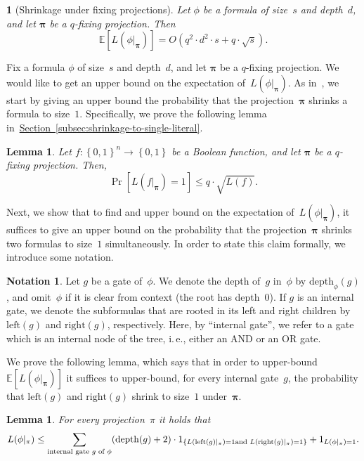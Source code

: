 \documentclass[11pt]{article}
\makeatletter
\numberwithin{equation}{section}
\newtheorem{lemma}[theorem]{Lemma}
\theoremstyle{definition}
\theoremstyle{plain}
\newcommand{\ie}{i.\,e.}
\newcommand{\expref}[2]{\hyperref[#2]{#1~\ref{#2}}}
\theoremstyle{definition}\newtheorem{notation}[theorem]{Notation}\theoremstyle{plain}
\newcommand{\E}{\mathbb{E}}
\newcommand{\B}{\left\{ 0,1 \right \}}
\newcommand{\p}{\boldsymbol{\pi}}
\newcommand{\dpt}{\mathrm{depth}}
\newcommand{\lc}{\mathrm{left}}
\newcommand{\rc}{\mathrm{right}}
\theoremstyle{definition}
\theoremstyle{plain}
\newtheorem*{restated@theorem}{\rep@title}
\newenvironment{restated}[1]{%
	 \def\rep@title{#1}%
	 \begin{restated@theorem}}%
	{\end{restated@theorem}}
\makeatother
\begin{document}
\begin{restated}{\expref{Theorem}{thm:shrinkage-fixing}}[Shrinkage under fixing projections]
Let $\phi$ be a formula of size~$s$ and depth~$d$, and let
$\p$ be a $q$-fixing projection. Then 
\[
\E\left[L(\phi|_{\p})\right]=O\!\left(q^{2}\cdot d^{2}\cdot s+q\cdot\sqrt{s}\right).
\]
\end{restated}

Fix a formula $\phi$ of size~$s$ and depth~$d$, and let $\p$
be a $q$-fixing projection. We would like to
%
get an upper bound on  %
the expectation
of~$L(\phi|_{\p})$. As in~\cite{H98}, we start by 
%
giving an upper bound %
the probability that the projection~$\p$ shrinks a formula to size~$1$.
Specifically, we prove the following lemma in~\expref{Section}{subsec:shrinkage-to-single-literal}. 
\begin{lemma}
\label{lemma:shrinkage-to-single-literal}Let $f\colon\B^{n}\to\B$ be a
Boolean function, and let $\p$ be a $q$-fixing projection. Then,
\[
\Pr\!\left[L(f|_{\p})=1\right]\le q\cdot\sqrt{L(f)}.
\]
\end{lemma}

Next, we show that to %
find and upper bound on %
the expectation of~$L(\phi|_{\p})$,
it suffices to %
give an upper bound on %
the probability that the projection~$\p$
shrinks two formulas to size~$1$ simultaneously. In order to state
this claim formally, we introduce some notation. 
\begin{notation}
Let $g$ be a gate of~$\phi$. We denote the depth of~$g$ in~$\phi$
by $\dpt_{\phi}(g)$, and omit~$\phi$ if it is clear from context
(the root has depth~$0$). If $g$ is an internal gate, we denote
the %
subformulas  %
that are rooted in its left and right children by
$\lc(g)$ and $\rc(g)$, respectively. Here, by ``internal gate'',
we refer to a gate which is an internal node of the tree, \ie, either
an AND or an OR gate.
\end{notation}

We prove the following lemma, which says that in order to upper-bound
$\E\left[L(\phi|_{\p})\right]$ it suffices to upper-bound, for every
internal gate~$g$, the probability that $\lc(g)$ and $\rc(g)$
shrink to size~$1$ under~$\p$. 
\begin{lemma}
\label{lemma:reduction-to-size-2}For every projection~$\pi$ it holds
that   %
\[
L(\phi|_{\pi})\le\sum_{\text{\rm internal gate \ensuremath{g} of \ensuremath{\phi}}}(\dpt(g)+2)\cdot1_{\left\{ L(\lc(g)|_{\pi})=1\text{\rm  and }L(\rc(g)|_{\pi})=1\right\} }+1_{L(\phi|_{\pi})=1}.
\]
\end{lemma}
\end{document}
